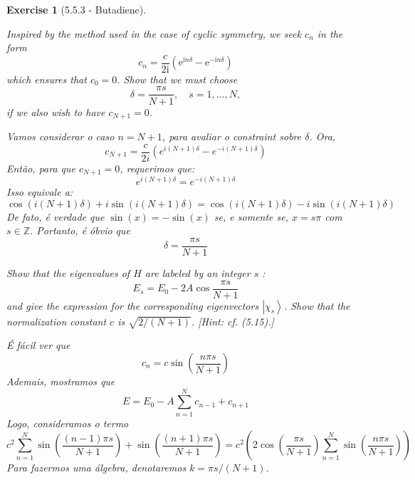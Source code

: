 \documentclass[12pt]{article}
\def\be{\begin{equation}}
\def\ee{\end{equation}}
\def\f{\frac}
\def\l{\left}
\def\r{\right}
\newtheorem{exercise}{Exercise}
\begin{document}
\begin{exercise}[5.5.3 - Butadiene]
\begin{exercises}
			\item Inspired by the method used in the case of cyclic symmetry, we seek $c_{n}$ in the form
			$$
			c_{n}=\frac{c}{2 \mathrm{i}}\left(\mathrm{e}^{\mathrm{i} n \delta}-\mathrm{e}^{-\mathrm{i} n \delta}\right)
			$$
			which ensures that $c_{0}=0$. Show that we must choose
			$$
			\delta=\frac{\pi s}{N+1}, \quad s=1, \ldots, N,
			$$
			if we also wish to have $c_{N+1}=0$. 
			\begin{multianswer}
				Vamos considerar o caso $n=N+1$, para avaliar o constraint sobre $\delta$. Ora,
				\be
					c_{N+1} = \f{c}{2i}\l( e^{i(N+1)\delta} - e^{-i(N+1)\delta}\r)
				\ee
				Então, para que $c_{N+1}=0$, requerimos que:
				\be
					e^{i(N+1)\delta} = e^{-i(N+1)\delta}
				\ee
				Isso equivale a:
				\be
					\cos(i(N+1)\delta) + i\sin(i(N+1)\delta) = \cos(i(N+1)\delta) - i\sin(i(N+1)\delta)
				\ee
				De fato, é verdade que $\sin(x) = -\sin(x)$ se, e somente se, $x=s\pi$ com $s\in\mathbb{Z}$. Portanto, é óbvio que
				\be
					\delta = \f{\pi s}{N+1}
				\ee
			\end{multianswer}
			
			\item Show that the eigenvalues of $H$ are labeled by an integer $s$ :
			$$
			E_{s}=E_{0}-2 A \cos \frac{\pi s}{N+1}
			$$
			and give the expression for the corresponding eigenvectors $\left|\chi_{s}\right\rangle$. Show that the normalization constant $c$ is $\sqrt{2 /(N+1)}$. [Hint: cf. (5.15).]
			\begin{multianswer}
				É fácil ver que
				\be
					c_n = c\sin\l(\f{n\pi s}{N+1}\r)
				\ee
				Ademais, mostramos que
				\be
					E = E_0 - A\sum_{n=1}^{N} c_{n-1} + c_{n+1}
				\ee
				Logo, consideramos o termo
				\be
					c^2\sum_{n=1}^N \sin\l(\f{(n-1)\pi s}{N+1}\r) + \sin\l(\f{(n+1)\pi s}{N+1}\r) = c^2 \l( 2\cos\l(\f{\pi s}{N+1}\r) \sum_{n=1}^N \sin\l(\f{ n\pi s}{N+1}\r) \r)
				\ee
				Para fazermos uma álgebra, denotaremos $k=\pi s/(N+1)$. 
			\end{multianswer}
			
		\end{exercises}		
	\end{exercise}
\end{document}
